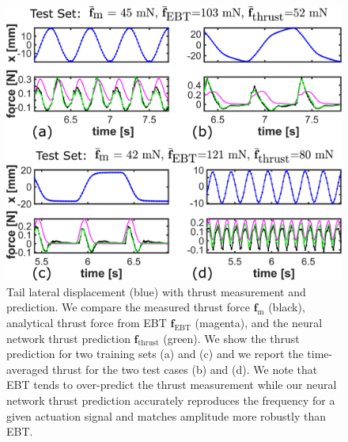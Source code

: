 \begin{figure}[t]
    \centering
    \includegraphics[width=1\columnwidth]{figures/hydrodynamics.png}
    \caption{Tail lateral displacement (blue) with thrust measurement and prediction. We compare the measured thrust force $\mathbf{f}_\textrm{m}$ (black), analytical thrust force from EBT $\mathbf{f}_\textrm{EBT}$ (magenta), and the neural network thrust prediction $\mathbf{f}_\textrm{thrust}$ (green). We show the thrust prediction for two training sets (a) and (c) and we report the time-averaged thrust for the two test cases (b) and (d). We note that EBT tends to over-predict the thrust measurement while our neural network thrust prediction accurately reproduces the frequency for a given actuation signal and matches amplitude more robustly than EBT.}
    \label{fig:thrust_prediction}
\end{figure}
